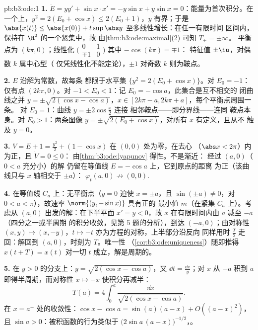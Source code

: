 \begin{solution}{pb:b3:ode:1}
\textbf{1.} $\dot E = yy' + \sin x\cdot x' = -y\sin x +
y\sin x = 0$：能量为首次积分。在一个上，$y^2 = 2(E_0 + \cos x) \leq 2(E_0 + 1)$，$y$
有界；于是 $\abs{x(t)} \leq \abs{x(0)} +
t\sup\abs y$ 至多线性增长：在任一有限时间
区间内，保持在 $\R^2$ 的一个紧集中，故
由\cref{thm:b3:ode:maximal}(2) 可知 $T_\pm = \pm\infty$。
平衡点为 $(k\pi, 0)$；线性化
$\bigl(\begin{smallmatrix}0&1\\
\mp1&0\end{smallmatrix}\bigr)$ 其中 $-\cos(k\pi) = \mp1$：
特征值 $\pm\iu$，对偶数 $k$ 属中心型（
仅凭线性化不能定论），$\pm1$ 对奇数 $k$ 则为鞍点。

\textbf{2.} $E$ 沿解为常数，故每条
都限于水平集 $\{y^2 = 2(E_0 + \cos x)\}$。对
$E_0 = -1$：仅有点 $(2k\pi, 0)$。对 $-1 < E_0 <
1$：记 $E_0 = -\cos a$，此集合是互不相交的
闭曲线之并 $y = \pm\sqrt{2(\cos x - \cos a)}$，$x \in
[2k\pi - a, 2k\pi + a]$，每个平衡点周围一条。
对 $E_0 = 1$：曲线 $y = \pm2\cos\frac x2$ 连接
相邻鞍点——即分界线——连同
鞍点本身。对 $E_0 > 1$：两条图像 $y =
\pm\sqrt{2(E_0 + \cos x)}$，对所有 $x$ 有定义，且从不
触及 $y = 0$。

\textbf{3.} $V = E + 1 = \frac{y^2}2 + (1 - \cos x)$
在 $(0,0)$ 处为零，在去心
（$\abs x < 2\pi$）内为正，且 $\dot V = 0 \leq 0$：
由\cref{thm:b3:ode:lyapunov} 得性。不是渐近：
经过 $(a, 0)$（$0 < a$ 充分小）的解
仍留在等值线 $E = -\cos a$ 上，它到原点的距离
为正（该曲线只与 $x$ 轴相交于 $\pm a$）：
$\varphi_t(a, 0) \not\to (0,0)$.

\textbf{4.} 在等值线 $C_a$ 上：无平衡点（$y = 0$
迫使 $x = \pm a$，且 $\sin(\pm a) \neq 0$，对 $0 < a <
\pi$），故速率 $\norm{(y, -\sin x)}$ 具有正的
最小值 $m$（在紧集 $C_a$ 上）。考虑从
$(a, 0)$ 出发的解：在下半平面 $x' = y < 0$，故 $x$
在有限时间内由 $a$ 减至 $-a$（四分之一或半周期
的积分收敛，见第 5 题的分析），到达
$(-a, 0)$；由对称性 $(x, y) \mapsto (x, -y)$，$t
\mapsto -t$ 亦为方程的对称，上半部分沿反向
同样用时 $\frac T2$ 走回：解回到
$(a, 0)$，时刻为 $T$。唯一性
（\cref{cor:b3:ode:uniqueness}）随即推得 $x(t + T) =
x(t)$ 对一切 $t$ 成立，解是周期的。

\textbf{5.} 在 $y > 0$ 的分支上：$y = \sqrt{2(\cos x
- \cos a)}$，又 $\dd t = \frac{\dd x}{y}$；对 $x$
从 $-a$ 积到 $a$ 即得半周期，而对称性 $x
\mapsto -x$ 使积分再减半：
\[
T(a) = 4\int_0^a\frac{\dd x}{\sqrt{2(\cos x - \cos a)}} .
\]
在 $x = a^-$ 处的收敛性：$\cos x - \cos a = \sin(a)(a - x) +
O((a-x)^2)$，且 $\sin a > 0$：被积函数的行为类似于
$\bigl(2\sin a\,(a - x)\bigr)^{-1/2}$，。


\end{solution}
